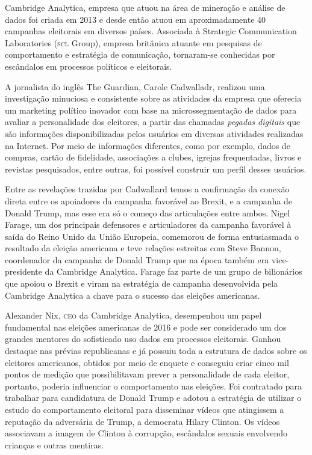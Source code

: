 Cambridge Analytica, empresa que atuou na área de mineração e análise de
dados foi criada em 2013 e desde então atuou em aproximadamente 40
campanhas eleitorais em diversos países. Associada à Strategic
Communication Laboratories (\textsc{scl} Group), empresa britânica atuante em
pesquisas de comportamento e estratégia de comunicação, tornaram-se
conhecidas por escândalos em processos políticos e eleitorais.

A jornalista do inglês The Guardian, Carole Cadwalladr, realizou
uma investigação minuciosa e consistente sobre as atividades da empresa
que oferecia um marketing político inovador com base na
microssegmentação de dados para avaliar a personalidade dos eleitores, a
partir das chamadas \textit{pegadas digitais} que são informações
disponibilizadas pelos usuários em diversas atividades realizadas na
Internet. Por meio de informações diferentes, como por exemplo, dados de
compras, cartão de fidelidade, associações a clubes, igrejas
frequentadas, livros e revistas pesquisados, entre outras, foi possível
construir um perfil desses usuários.

Entre as revelações trazidas por Cadwallard temos a confirmação da
conexão direta entre os apoiadores da campanha favorável ao Brexit, e a
campanha de Donald Trump, mas esse era só o começo das articulações
entre ambos. Nigel Farage, um dos principais defensores e articuladores
da campanha favorável à saída do Reino Unido da União Europeia,
comemorou de forma entusiasmada o resultado da eleição americana e teve
relações estreitas com Steve Bannon, coordenador da campanha de Donald
Trump que na época também era vice-presidente da Cambridge Analytica.
Farage faz parte de um grupo de bilionários que apoiou o Brexit e viram
na estratégia de campanha desenvolvida pela Cambridge Analytica a chave
para o sucesso das eleições americanas.

Alexander Nix, \textsc{ceo} da Cambridge Analytica, desempenhou um papel
fundamental nas eleições americanas de 2016 e pode ser considerado um
dos grandes mentores do sofisticado uso dados em processos eleitorais.
Ganhou destaque nas prévias republicanas e já possuiu toda a estrutura
de dados sobre os eleitores americanos, obtidos por meio de enquete e
conseguiu criar cinco mil pontos de medição que possibilitavam prever a
personalidade de cada eleitor, portanto, poderia influenciar o
comportamento nas eleições. Foi contratado para trabalhar para
candidatura de Donald Trump e adotou a estratégia de utilizar o estudo
do comportamento eleitoral para disseminar vídeos que atingissem a
reputação da adversária de Trump, a democrata Hilary Clinton. Os vídeos
associavam a imagem de Clinton à corrupção, escândalos sexuais
envolvendo crianças e outras mentiras.

